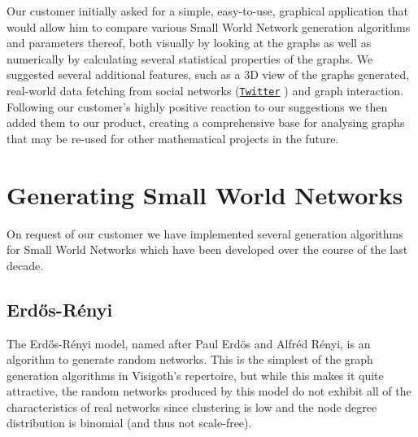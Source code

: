 \documentclass[a4paper,11pt,titlepage]{article}
\let\stdhref\href
\renewcommand{\href}[2]{\stdhref{#1}{\texttt{#2}}}
\let\stdsection\section         %
\renewcommand{\section}{\newpage\stdsection}
\newcommand{\Twitter}{\href{http://twitter.com}{Twitter} }
\begin{document}
%
%

Our customer initially asked for a simple, easy-to-use, graphical
application that would allow him to compare various Small World
Network generation algorithms and parameters thereof, both visually
by looking at the graphs as well as numerically by calculating
several statistical properties of the graphs.
We suggested several additional features, such as a 3D view of the
graphs generated, real-world data fetching from social networks
(\Twitter) and graph interaction. Following our customer's highly
positive reaction to our suggestions we then added them to our
product, creating a comprehensive base for analysing graphs that
may be re-used for other mathematical projects in the future.




\section{Generating Small World Networks}
\label{sec:algos}

On request of our customer we have implemented several generation
algorithms for Small World Networks which have been developed over
the course of the last decade.


\subsection{Erd\H{o}s-R\'{e}nyi}
The Erd\H{o}s-R\'{e}nyi model, named after Paul Erd\"{o}s and
Alfr\'{e}d R\'{e}nyi, is an algorithm to generate random networks.
This is the simplest of the graph generation algorithms in Visigoth's
repertoire, but while this makes it quite attractive,
the random networks produced by this model do not exhibit all of
the characteristics of real networks since clustering is low and
the node degree distribution is binomial (and thus not scale-free).
\end{document}
